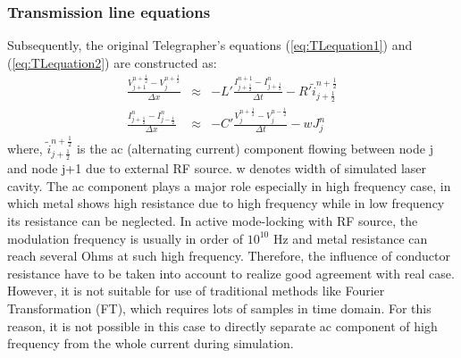 \documentclass[11pt,final]{scrbook}
\begin{document}
\subsubsection{Transmission line equations}
Subsequently, the original Telegrapher's equations (\ref{eq:TLequation1}) and (\ref{eq:TLequation2}) are constructed as:
\begin{eqnarray}
\frac { { V }_{ j+1 }^{ n+\frac{1}{2} }-{ V }_{ j }^{ n+\frac{1}{2} } }{ \Delta x } & \approx & -L'\frac { { I }_{ j+\frac{1}{2} }^{ n+1 }-{ I }_{ j+\frac{1}{2} }^{ n } }{ \Delta t } -R' \widetilde{ i } _{ j+\frac{1}{2} }^{ n+\frac{1}{2} } \label{eq:TLequation3}\\
\frac{{ I }_{ j+\frac{1}{2} }^{ n } - { I }_{ j-\frac{1}{2} }^{ n }}{\Delta x} & \approx & -C'\frac {{ V }_{ j }^{ n+\frac{1}{2} }-{ V }_{ j }^{ n-\frac{1}{2} }}{ \Delta t }-w{J}_{j}^{n} \label{eq:TLequation4}
\end{eqnarray}
where, $ \widetilde{ i } _{ j+\frac{1}{2} }^{ n+\frac{1}{2} }$ is the ac (alternating current) component flowing between node j and node j+1 due to external RF source. w denotes width of simulated laser cavity. The ac component plays a major role especially in high frequency case, in which metal shows high resistance due to high frequency while in low frequency its resistance can be neglected. In active mode-locking with RF source, the modulation frequency is usually in order of $10^{10}$ Hz and metal resistance can reach several Ohms at such high frequency. Therefore, the influence of conductor resistance have to be taken into account to realize good agreement with real case. However, it is not suitable for use of traditional methods like Fourier Transformation (FT), which requires lots of samples in time domain. For this reason, it is not possible in this case to directly separate ac component of high frequency from the whole current during simulation.
\end{document}
